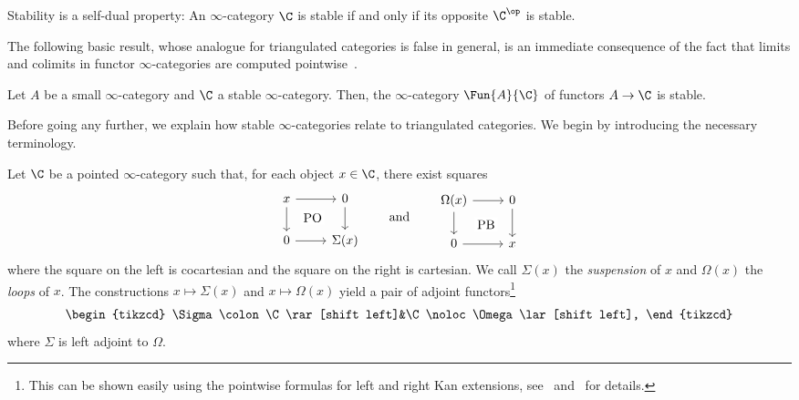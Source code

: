 \documentclass[a4paper]{amsart}
\begin{document}
\begin{remark}
  Stability is a self-dual property: An $\infty$-category $\C$ is stable if and
  only if its opposite $\C^\op$ is stable.
\end{remark}

The following basic result, whose analogue for triangulated categories is false
in general, is an immediate consequence of the fact that limits and colimits in functor
$\infty$-categories are computed pointwise~\cite[Corollary~5.1.2.3]{Lur09}.

\begin{proposition}
  \label{prop:stable_functor_categories}
  Let $A$ be a small $\infty$-category and $\C$ a stable $\infty$-category.
  Then, the $\infty$-category $\Fun{A}{\C}$ of functors $A\to\C$ is stable.
\end{proposition}

Before going any further, we explain how stable $\infty$-categories relate to
triangulated categories. We begin by introducing the necessary terminology.

\begin{defprop}
  Let $\C$ be a pointed $\infty$-category such that, for each object $x\in\C$,
  there exist squares
  \[
    \begin{tikzcd}
      x\rar\dar\ar[phantom]{dr}[description]{\text{PO}}&0\dar\\
      0\rar&\Sigma(x)
    \end{tikzcd}\qquad\text{and}\qquad%
    \begin{tikzcd}
      \Omega(x)\rar\dar\ar[phantom]{dr}[description]{\text{PB}}&0\dar\\
      0\rar&x
    \end{tikzcd}
  \]
  where the square on the left is cocartesian and the square on the right is
  cartesian. We call $\Sigma(x)$ the \emph{suspension} of $x$ and $\Omega(x)$
  the \emph{loops} of $x$. The constructions $x\mapsto\Sigma(x)$ and
  $x\mapsto\Omega(x)$ yield a pair of adjoint functors\footnote{This can be
    shown easily using the pointwise formulas for left and right Kan extensions,
    see~\cite[Section~4.3.2]{Lur09} and~\cite[Remark~1.1.1.7]{Lur17} for details.}
  \[
    \begin{tikzcd}
      \Sigma\colon\C\rar[shift left]&\C\noloc\Omega\lar[shift left],
    \end{tikzcd}
  \]
  where $\Sigma$ is left adjoint to $\Omega$.
\end{defprop}
\end{document}
